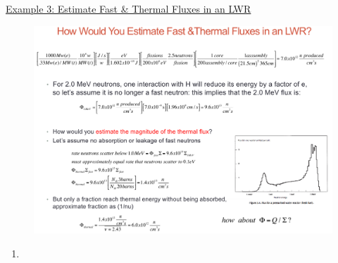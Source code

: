 \documentclass{school-22.211-notes}
\begin{document}
\uline{Example 3: Estimate Fast \& Thermal Fluxes in an LWR}
\begin{figure}[ht]
  \centering
  \includegraphics[width=4.5in]{images/lec1-example3.png}
\end{figure}

\clearpage
\begin{enumerate}
\item 

\end{enumerate}
\end{document}
